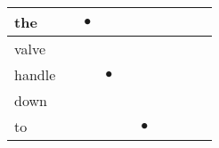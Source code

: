 \documentclass[landscape]{article}
\newcommand{\ssp}{\hspace{2pt}}
\newcommand{\mex}{\cellcolor{g}$\bullet$}
\begin{document}
\begin{tabular}{|l|p{10pt}|p{10pt}|p{10pt}|p{10pt}|p{10pt}|p{10pt}|p{10pt}|p{10pt}|p{10pt}|}
\hline
\ssp \cellcolor{ref1}the \ssp&\hspace{2pt}&\hspace{2pt}\mex&\hspace{2pt}&\hspace{2pt}&\hspace{2pt}&\hspace{2pt}&\hspace{2pt}&\hspace{2pt}&\hspace{2pt}\\
\hline
\ssp valve \ssp&\hspace{2pt}&\hspace{2pt}&\hspace{2pt}&\hspace{2pt}&\hspace{2pt}&\hspace{2pt}&\hspace{2pt}&\hspace{2pt}&\hspace{2pt}\\
\hline
\ssp \cellcolor{ref2}handle \ssp&\hspace{2pt}&\hspace{2pt}&\hspace{2pt}\mex&\hspace{2pt}&\hspace{2pt}&\hspace{2pt}&\hspace{2pt}&\hspace{2pt}&\hspace{2pt}\\
\hline
\ssp down \ssp&\hspace{2pt}&\hspace{2pt}&\hspace{2pt}&\hspace{2pt}&\hspace{2pt}&\hspace{2pt}&\hspace{2pt}&\hspace{2pt}&\hspace{2pt}\\
\hline
\ssp \cellcolor{ref4}to \ssp&\hspace{2pt}&\hspace{2pt}&\hspace{2pt}&\hspace{2pt}&\hspace{2pt}\mex&\hspace{2pt}&\hspace{2pt}&\hspace{2pt}&\hspace{2pt}\\

\end{tabular}
\end{document}
